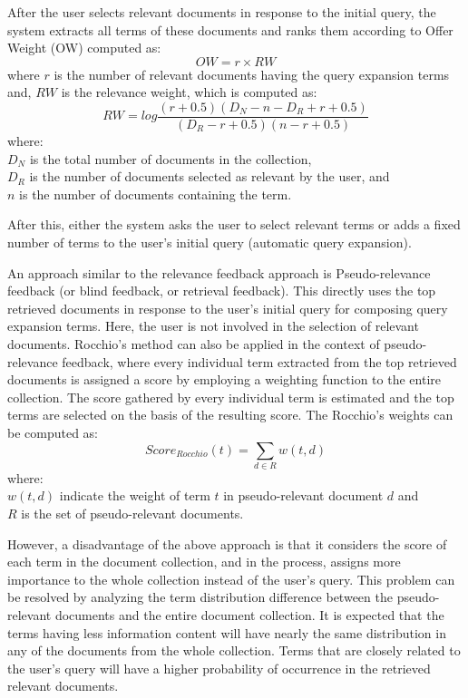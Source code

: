 
After the user selects relevant documents in response to the initial query, the system extracts all terms of these documents and ranks them according to  Offer Weight (OW) computed as: 
\begin{equation}
OW=r \times RW
\end{equation}  
where $r$ is the number of relevant documents having the query expansion terms and, $RW$ is the relevance weight, which is computed as:
\begin{equation}
RW= log \frac{(r+0.5)(D_N-n-D_R+r+0.5)}{(D_R-r+0.5)(n-r+0.5)}
\end{equation}
where:\\
$D_N$ is the total number of documents in the collection,\\
$D_R$ is the number of documents selected as relevant by the user, and\\
$n$ is the number of documents containing the term.

After this, either the system asks the user to select relevant terms or adds a fixed number of terms to the user's initial query (automatic query expansion).  

An approach similar to the relevance feedback approach is Pseudo-relevance feedback (or blind feedback, or retrieval feedback). This directly uses the top retrieved documents in response to the user's initial query for composing query expansion terms. Here, the user is not involved in the selection of relevant documents.  Rocchio's method \cite{rocchio1971relevance} can also be applied  in the context of pseudo-relevance feedback, where every individual term extracted from the top retrieved documents is assigned a score by employing a weighting function to the entire collection. The score gathered by every individual term is estimated and the top terms are selected on the basis of the resulting score. The Rocchio's weights can be computed as:
\begin{equation}\label{eq:18}
Score_{Rocchio}(t)= \sum_{d\in R}w(t,d)
\end{equation}
where: \\$w(t,d)$ indicate the weight of term $t$ in pseudo-relevant document $d$ and  \\$R$ is the set of pseudo-relevant documents.

However, a disadvantage of the above approach is that it considers the score of each term in the document collection, and in the process, assigns more importance to the whole collection instead of the user's query. This problem can be resolved by analyzing the term distribution difference between the pseudo-relevant documents and the entire document collection. It is expected that the terms having less information content will have nearly the same distribution in any of the documents from the whole collection. Terms that are closely related to the user's query will have a higher probability of occurrence in the retrieved relevant documents. 


